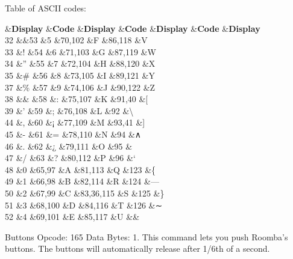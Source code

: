 \begin{Desc}
\begin{description}
Table of A\+S\+C\+I\+I codes\+: \begin{TabularC}{8}
\hline
{}&{\bf Display }&{\bf Code }&{\bf Display }&{\bf Code }&{\bf Display }&{\bf Code }&{\bf Display  }\\
32 &&53 &5 &70,102 &F &86,118 &V \\
33 &! &54 &6 &71,103 &G &87,119 &W \\
34 &” &55 &7 &72,104 &H &88,120 &X \\
35 &\# &56 &8 &73,105 &I &89,121 &Y \\
37 &\% &57 &9 &74,106 &J &90,122 &Z \\
38 &\& &58 &\+: &75,107 &K &91,40 &\mbox{[} \\
39 &’ &59 &; &76,108 &L &92 &\textbackslash{} \\
44 &, &60 &¡ &77,109 &M &93,41 &\mbox{]} \\
45 &-\/ &61 &= &78,110 &N &94 &∧ \\
46 &. &62 &¿ &79,111 &O &95 &\\
47 &/ &63 &? &80,112 &P &96 &‘ \\
48 &0 &65,97 &A &81,113 &Q &123 &\{ \\
49 &1 &66,98 &B &82,114 &R &124 &— \\
50 &2 &67,99 &C &83,36,115 &S &125 &\} \\
51 &3 &68,100 &D &84,116 &T &126 &∼ \\
52 &4 &69,101 &E &85,117 &U &&\\
\end{TabularC}
\item[{\em 
\hypertarget{group__roomba-lib_gga305e17dfb7050ad83ea49ded2e6a2e24ab369d673cdfb4414fb307ddaef5288dd}{}R\+O\+O\+M\+B\+A\+\_\+\+B\+U\+T\+T\+O\+N\+S\+\_\+\+C\+M\+D\label{group__roomba-lib_gga305e17dfb7050ad83ea49ded2e6a2e24ab369d673cdfb4414fb307ddaef5288dd}
}]Buttons Opcode\+: 165 Data Bytes\+: 1. This command lets you push Roomba’s buttons. The buttons will automatically release after 1/6th of a second.
\begin{DoxyItemize}

\end{DoxyItemize}
\end{description}
\end{Desc}

